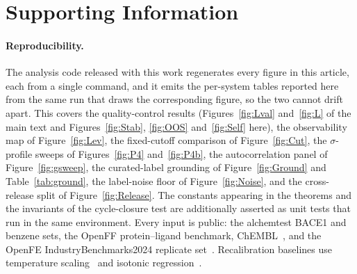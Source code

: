 \section*{Supporting Information}

\paragraph{Reproducibility.} The analysis code released with this work regenerates every figure
in this article, each from a single command, and it emits the per-system tables reported here
from the same run that draws the corresponding figure, so the two cannot drift apart. This covers
the quality-control results (Figures~\ref{fig:Lval} and~\ref{fig:L} of the main text and
Figures~\ref{fig:Stab}, \ref{fig:OOS} and~\ref{fig:Self} here), the observability map of
Figure~\ref{fig:Lev}, the fixed-cutoff comparison of Figure~\ref{fig:Cut}, the $\sigma$-profile
sweeps of Figures~\ref{fig:P4} and~\ref{fig:P4b}, the autocorrelation panel of
Figure~\ref{fig:gsweep}, the curated-label grounding of Figure~\ref{fig:Ground} and
Table~\ref{tab:ground}, the label-noise floor of Figure~\ref{fig:Noise}, and the cross-release
split of Figure~\ref{fig:Release}. The constants appearing in the theorems and the invariants of the
cycle-closure test are additionally asserted as unit tests that run in the same environment.
Every input is public: the alchemtest BACE1 and benzene sets, the OpenFF
protein--ligand benchmark, ChEMBL~\citep{zdrazil2024chembl}, and the OpenFE
IndustryBenchmarks2024 replicate set~\citep{baumann2025industrybenchmarks}. Recalibration
baselines use temperature scaling~\citep{guo2017calibration} and isotonic
regression~\citep{zadrozny2002isotonic}.

